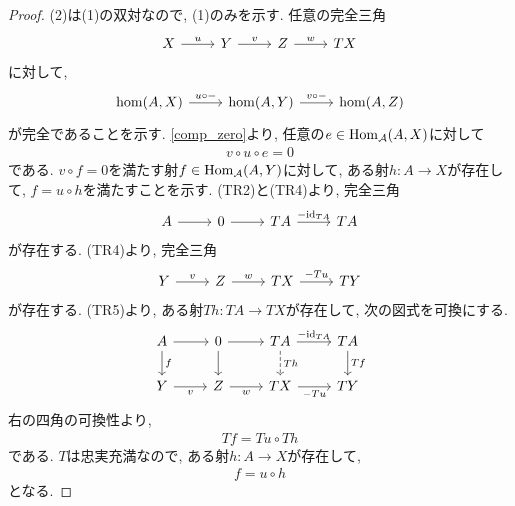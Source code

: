 \documentclass[uplatex, a4paper, 14Q, dvipdfmx]{jsarticle}
\begin{document}
\begin{proof}
  (2)は(1)の双対なので, (1)のみを示す.  
  任意の完全三角
  \[\begin{tikzcd}
    X & Y & Z & TX
    \arrow["u", from=1-1, to=1-2]
    \arrow["v", from=1-2, to=1-3]
    \arrow["w", from=1-3, to=1-4]
  \end{tikzcd}\]
  に対して, 
  \[\begin{tikzcd}
    {\hom(A,X)} & {\hom(A,Y)} & {\hom(A,Z)}
    \arrow["{u \circ -}", from=1-1, to=1-2]
    \arrow["{v \circ -}", from=1-2, to=1-3]
  \end{tikzcd}\]
  が完全であることを示す. 
  \cref{comp_zero}より, 任意の$e \in \mathrm{Hom}_{\mathcal{A}}(A,X)$に対して
  \begin{align*}
    v \circ u \circ e
    = 0
  \end{align*}
  である. 
  $v \circ f = 0$を満たす射$f \in \mathrm{Hom}_{\mathcal{A}}(A,Y)$に対して, ある射$h: A \to X$が存在して, $f = u \circ h$を満たすことを示す. 
  (TR2)と(TR4)より, 完全三角
  \[\begin{tikzcd}
    A & 0 & TA & TA
    \arrow[from=1-1, to=1-2]
    \arrow[from=1-2, to=1-3]
    \arrow["{-\id_{TA}}", from=1-3, to=1-4]
  \end{tikzcd}\]
  が存在する.
  (TR4)より, 完全三角
  \[\begin{tikzcd}
    Y & Z & TX & TY
    \arrow["v", from=1-1, to=1-2]
    \arrow["w", from=1-2, to=1-3]
    \arrow["{-Tu}", from=1-3, to=1-4]
  \end{tikzcd}\]
  が存在する. 
  (TR5)より, ある射$Th: TA \to TX$が存在して, 次の図式を可換にする. 
  \[\begin{tikzcd}
    A & 0 & TA & TA \\
    {Y} & {Z} & {TX} & {TY}
    \arrow[from=1-1, to=1-2]
    \arrow[from=1-2, to=1-3]
    \arrow["{-\id_{TA}}", from=1-3, to=1-4]
    \arrow["f", from=1-1, to=2-1]
    \arrow[from=1-2, to=2-2]
    \arrow["{Th}", dashed, from=1-3, to=2-3]
    \arrow["{Tf}", from=1-4, to=2-4]
    \arrow["{v}"', from=2-1, to=2-2]
    \arrow["{w}"', from=2-2, to=2-3]
    \arrow["{-Tu}"', from=2-3, to=2-4]
  \end{tikzcd}\]
  右の四角の可換性より, 
  \begin{align*}
    Tf 
    = Tu \circ Th
  \end{align*}
  である. 
  $T$は忠実充満なので, ある射$h: A \to X$が存在して, 
  \begin{align*}
    f 
    = u \circ h
  \end{align*}
  となる. 
\end{proof}
\end{document}
